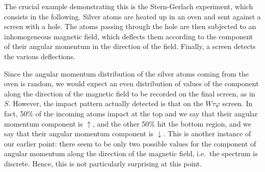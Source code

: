 \begin{enumerate}[label=(\alph*)]
The crucial example demonstrating this is the Stern-Gerlach experiment, which consists in the following. Silver atoms are heated up in an oven and sent against a screen with a hole. The atoms passing through the hole are then subjected to an inhomogeneous magnetic field, which deflects them according to the component of their angular momentum in the direction of the field. Finally, a screen detects the various deflections.

\begin{center}
\end{center}

Since the angular momentum distribution of the silver atoms coming
from the oven is random, we would expect an even distribution of
values of the component along the direction of the magnetic field to
be recorded on the final screen, as in $S$. However, the impact
pattern actually detected is that on the $W\tau\varphi$ screen. In
fact, 50\% of the incoming atoms impact at the top and we say that
their angular momentum component is $\uparrow$, and the other 50\% hit
the bottom region, and we say that their angular momentum component is
$\downarrow$.  This is another instance of our earlier point: there
seem to be only two possible values for the component of angular
momentum along the direction of the magnetic field, i.e.\ the spectrum
is discrete. Hence, this is not particularly surprising at this
point.


\end{enumerate}
